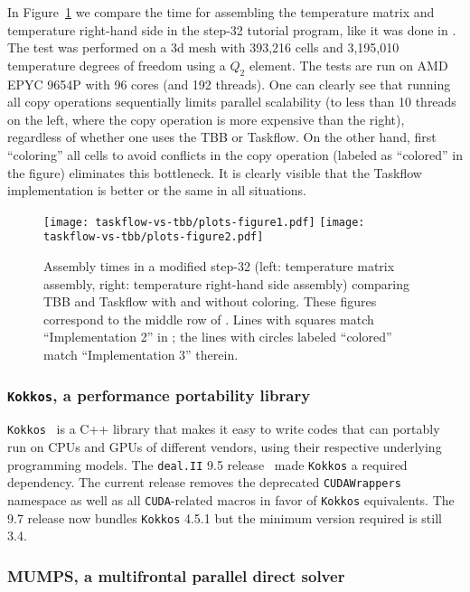 \documentclass{ansarticle-preprint}
\newcommand{\specialword}[1]{\texttt{#1}}
\newcommand{\dealii}{{\specialword{deal.II}}\xspace}
\newcommand{\kokkos}{{\specialword{Kokkos}}\xspace}
\begin{document}
In Figure~\ref{fig:tbb-vs-taskflow} we compare the time for assembling
the temperature matrix and temperature right-hand side in the step-32
tutorial program, like it was done in \cite{TKB16}. The test was performed
on a 3d mesh with 393,216 cells and 3,195,010 temperature degrees of freedom
using a $Q_2$ element. The tests are run
on AMD EPYC 9654P with 96 cores (and 192 threads). One can clearly see that
running all copy operations sequentially limits parallel scalability (to less than 10
threads on the left, where the copy operation is more expensive than
the right), regardless of whether one uses the TBB or Taskflow. On the
other hand, first ``coloring'' all cells to avoid conflicts in
the copy operation (labeled as ``colored'' in the figure) eliminates this bottleneck.
It is clearly visible that the Taskflow implementation is better or the same
in all situations.

\begin{figure}[tb]
\texttt{[image: taskflow-vs-tbb/plots-figure1.pdf]}\hfill
\texttt{[image: taskflow-vs-tbb/plots-figure2.pdf]}
\caption{Assembly times in a modified step-32 (left: temperature
  matrix assembly, right: temperature right-hand side assembly)
  comparing TBB and Taskflow with and without coloring. These figures
  correspond to the middle row of \cite[Fig. 4]{TKB16}. Lines with
  squares match ``Implementation 2'' in \cite{TKB16}; the lines with
  circles labeled ``colored'' match ``Implementation 3'' therein.}
\label{fig:tbb-vs-taskflow}
\end{figure}


\subsubsection{\kokkos, a performance portability library}
\label{subsec:external-kokkos}

\kokkos~\cite{trott2022} is a C++ library that makes it easy to write codes that can
portably run on CPUs and GPUs of different vendors, using their
respective underlying programming models.
The \dealii{} 9.5 release~\cite{dealII95} made \kokkos a required
dependency. The current release removes the deprecated \texttt{CUDAWrappers} namespace as well
as all \texttt{CUDA}-related macros in favor of \kokkos
equivalents. The 9.7 release now bundles \kokkos 4.5.1 but the minimum version required is still 3.4.

\subsubsection{MUMPS, a multifrontal parallel direct solver}
\end{document}
